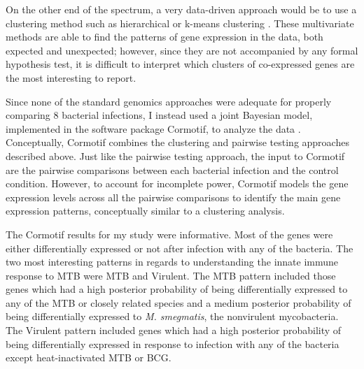 On the other end of the spectrum, a very data-driven approach would be to use a
clustering method such as hierarchical or k-means clustering \citep{Eisen1998, Michaels1998}. These multivariate
methods are able to find the patterns of gene expression in the data, both
expected and unexpected; however, since they are not accompanied by any formal
hypothesis test, it is difficult to interpret which clusters of co-expressed
genes are the most interesting to report.

Since none of the standard genomics approaches were adequate for properly
comparing 8 bacterial infections, I instead used a joint Bayesian model,
implemented in the software package Cormotif, to analyze the data \citep{Wei2015}. Conceptually,
Cormotif combines the clustering and pairwise testing approaches described
above. Just like the pairwise testing approach, the input to Cormotif are the
pairwise comparisons between each bacterial infection and the control
condition. However, to account for incomplete power, Cormotif models the gene
expression levels across all the pairwise comparisons to identify the main gene
expression patterns, conceptually similar to a clustering analysis.

The Cormotif results for my study were informative. Most of the genes were
either differentially expressed or not after infection with any of the
bacteria. The two most interesting patterns in regards to understanding the
innate immune response to MTB were MTB and Virulent.  The MTB pattern included
those genes which had a high posterior probability of being differentially
expressed to any of the MTB or closely related species and a medium posterior
probability of being differentially expressed to \emph{M. smegmatis}, the
nonvirulent mycobacteria. The Virulent pattern included genes which had a high
posterior probability of being differentially expressed in response to infection
with any of the bacteria except heat-inactivated MTB or BCG.

